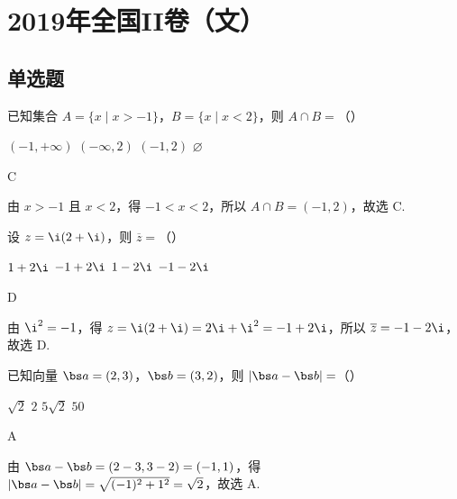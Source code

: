 \chapter{2019年全国II卷（文）}

\section{单选题}

\begin{problem}
已知集合 \(A=\{x\mid x>-1\}\)，\(B=\{x\mid x<2\}\)，则 \(A\cap B=\)（\quad）

\choices
    {\((-1,+\infty)\)}
    {\((-\infty,2)\)}
    {\((-1,2)\)}
    {\(\varnothing\)}
\end{problem}

\begin{answer}
C
\end{answer}

\begin{solution}
由 \(x>-1\) 且 \(x<2\)，得 \(-1<x<2\)，所以 \(A\cap B=(-1,2)\)，故选 C.
\end{solution}

\begin{problem}
设 \(z=\i(2+\i)\)，则 \(\overline z=\)（\quad）

\choices
    {\(1+2\i\)}
    {\(-1+2\i\)}
    {\(1-2\i\)}
    {\(-1-2\i\)}
\end{problem}

\begin{answer}
D
\end{answer}

\begin{solution}
由 \(\i^2=-1\)，得 \(z=\i(2+\i)=2\i+\i^2=-1+2\i\)，所以 \(\overline z=-1-2\i\)，故选 D.
\end{solution}

\begin{problem}
已知向量 \(\bs a=(2,3)\)，\(\bs b=(3,2)\)，则 \(|\bs a-\bs b|=\)（\quad）

\choices
    {\(\sqrt2\)}
    {\(2\)}
    {\(5\sqrt2\)}
    {\(50\)}
\end{problem}

\begin{answer}
A
\end{answer}

\begin{solution}
由 \(\bs a-\bs b=(2-3,3-2)=(-1,1)\)，得 \(|\bs a-\bs b|=\sqrt{(-1)^2+1^2}=\sqrt2\)，故选 A.
\end{solution}

